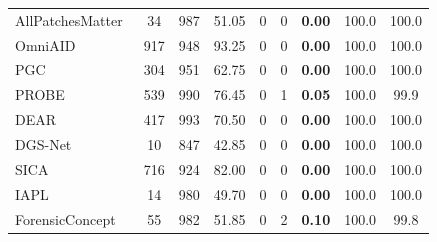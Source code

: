 \begin{table}[t]
\begin{tabular*}{\textwidth}{@{\extracolsep{\fill}}l ccc ccc cc}
AllPatchesMatter~\cite{allpatches}
& 34 & 987 & 51.05 & 0 & 0 & \cellcolor{red!12}\textbf{0.00} & 100.0 & 100.0 \\
OmniAID~\cite{omniaid}
& 917 & 948 & \cellcolor{green!15}93.25 & 0 & 0 & \cellcolor{red!12}\textbf{0.00} & 100.0 & 100.0 \\
PGC~\cite{pgc}
& 304 & 951 & 62.75 & 0 & 0 & \cellcolor{red!12}\textbf{0.00} & 100.0 & 100.0 \\
PROBE~\cite{probe}
& 539 & 990 & 76.45 & 0 & 1 & \cellcolor{red!12}\textbf{0.05} & 100.0 & 99.9 \\
DEAR~\cite{dear}
& 417 & 993 & 70.50 & 0 & 0 & \cellcolor{red!12}\textbf{0.00} & 100.0 & 100.0 \\
DGS-Net~\cite{dgsnet}
& 10 & 847 & 42.85 & 0 & 0 & \cellcolor{red!12}\textbf{0.00} & 100.0 & 100.0 \\
SICA~\cite{sica}
& 716 & 924 & \cellcolor{green!15}82.00 & 0 & 0 & \cellcolor{red!12}\textbf{0.00} & 100.0 & 100.0 \\
IAPL~\cite{iapl}
& 14 & 980 & 49.70 & 0 & 0 & \cellcolor{red!12}\textbf{0.00} & 100.0 & 100.0 \\
ForensicConcept~\cite{forensicconcept}
& 55 & 982 & 51.85 & 0 & 2 & \cellcolor{red!12}\textbf{0.10} & 100.0 & 99.8 \\
\bottomrule
\end{tabular*}
\end{table}
